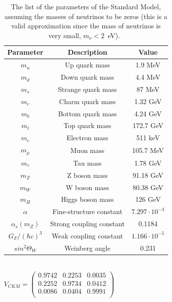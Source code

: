 \begin{table}[ht!]
\centering
\begin{tabular}{c|c|c} \hline\hline
Parameter & Description & Value \\\hline

$m_{u}$ & Up quark mass &  1.9 MeV \\
$m_{d}$ & Down quark mass & 4.4 MeV \\
$m_{s}$ & Strange quark mass & 87 MeV \\
$m_{c}$ & Charm quark mass & 1.32 GeV \\
$m_{b}$ & Bottom quark mass & 4.24 GeV \\
$m_{t}$ & Top quark mass & 172.7 GeV \\
\hline
$m_{e}$ & Electron mass & 511 keV \\
$m_{\mu}$ & Muon mass & 105.7 MeV \\
$m_{\tau}$ & Tau mass & 1.78 GeV \\
\hline
$m_{Z}$ & Z boson mass & 91.18 GeV \\
$m_{W}$ & W boson mass & 80.38 GeV \\
$m_{H}$ & Higgs boson mass & 126 GeV \\
\hline
$\alpha$ & Fine-structure constant & $7.297 \cdot 10^{-3}$\\
$\alpha_{s}(m_Z)$ & Strong coupling constant & 0.1184\\
$G_{F}/(\hbar c)^3$ & Weak coupling constant & $1.166 \cdot 10^{-5}$ \\
\hline
$sin^{2} \Theta_{W}$ & Weinberg angle & 0.231 \\
\hline\hline
\end{tabular}
\\[2ex]
$V_{CKM} = \left(\begin{array}{ccc}
0.9742 & 0.2253 & 0.0035 \\
0.2252 & 0.9734 & 0.0412 \\
0.0086 & 0.0404 & 0.9991 \\
\end{array}\right)$
\caption{The list of the parameters of the Standard Model, assuming the masses of neutrinos to be zeros (this is a valid approximation since the mass of neutrinos is very small, $m_\nu < 2$~eV).~\cite{lib:PDG}}
\label{tab:SM_parameters}
\end{table}

